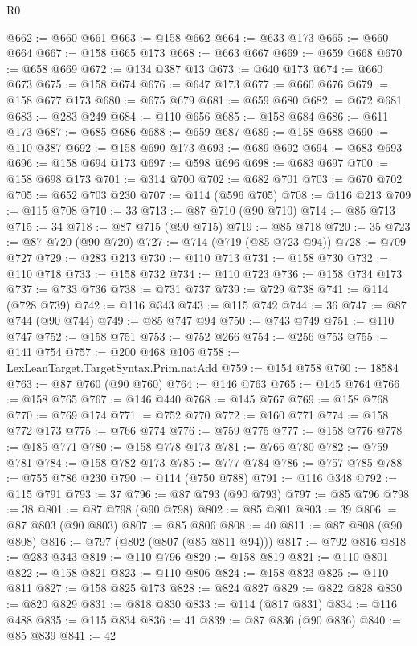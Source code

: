 \begin{lexlean}{R0}
\begin{coremodule}
@662 := @660 @661
@663 := @158 @662
@664 := @633 @173
@665 := @660 @664
@667 := @158 @665 @173
@668 := @663 @667
@669 := @659 @668
@670 := @658 @669
@672 := @134 @387 @13
@673 := @640 @173
@674 := @660 @673
@675 := @158 @674
@676 := @647 @173
@677 := @660 @676
@679 := @158 @677 @173
@680 := @675 @679
@681 := @659 @680
@682 := @672 @681
@683 := @283 @249
@684 := @110 @656
@685 := @158 @684
@686 := @611 @173
@687 := @685 @686
@688 := @659 @687
@689 := @158 @688
@690 := @110 @387
@692 := @158 @690 @173
@693 := @689 @692
@694 := @683 @693
@696 := @158 @694 @173
@697 := @598 @696
@698 := @683 @697
@700 := @158 @698 @173
@701 := @314 @700
@702 := @682 @701
@703 := @670 @702
@705 := @652 @703 @230
@707 := @114 (@596 @705)
@708 := @116 @213
@709 := @115 @708
@710 := 33
@713 := @87 @710 (@90 @710)
@714 := @85 @713
@715 := 34
@718 := @87 @715 (@90 @715)
@719 := @85 @718
@720 := 35
@723 := @87 @720 (@90 @720)
@727 := @714 (@719 (@85 @723 @94))
@728 := @709 @727
@729 := @283 @213
@730 := @110 @713
@731 := @158 @730
@732 := @110 @718
@733 := @158 @732
@734 := @110 @723
@736 := @158 @734 @173
@737 := @733 @736
@738 := @731 @737
@739 := @729 @738
@741 := @114 (@728 @739)
@742 := @116 @343
@743 := @115 @742
@744 := 36
@747 := @87 @744 (@90 @744)
@749 := @85 @747 @94
@750 := @743 @749
@751 := @110 @747
@752 := @158 @751
@753 := @752 @266
@754 := @256 @753
@755 := @141 @754
@757 := @200 @468 @106
@758 := LexLeanTarget.TargetSyntax.Prim.natAdd
@759 := @154 @758
@760 := 18584
@763 := @87 @760 (@90 @760)
@764 := @146 @763
@765 := @145 @764
@766 := @158 @765
@767 := @146 @440
@768 := @145 @767
@769 := @158 @768
@770 := @769 @174
@771 := @752 @770
@772 := @160 @771
@774 := @158 @772 @173
@775 := @766 @774
@776 := @759 @775
@777 := @158 @776
@778 := @185 @771
@780 := @158 @778 @173
@781 := @766 @780
@782 := @759 @781
@784 := @158 @782 @173
@785 := @777 @784
@786 := @757 @785
@788 := @755 @786 @230
@790 := @114 (@750 @788)
@791 := @116 @348
@792 := @115 @791
@793 := 37
@796 := @87 @793 (@90 @793)
@797 := @85 @796
@798 := 38
@801 := @87 @798 (@90 @798)
@802 := @85 @801
@803 := 39
@806 := @87 @803 (@90 @803)
@807 := @85 @806
@808 := 40
@811 := @87 @808 (@90 @808)
@816 := @797 (@802 (@807 (@85 @811 @94)))
@817 := @792 @816
@818 := @283 @343
@819 := @110 @796
@820 := @158 @819
@821 := @110 @801
@822 := @158 @821
@823 := @110 @806
@824 := @158 @823
@825 := @110 @811
@827 := @158 @825 @173
@828 := @824 @827
@829 := @822 @828
@830 := @820 @829
@831 := @818 @830
@833 := @114 (@817 @831)
@834 := @116 @488
@835 := @115 @834
@836 := 41
@839 := @87 @836 (@90 @836)
@840 := @85 @839
@841 := 42

\end{coremodule}
\end{lexlean}
